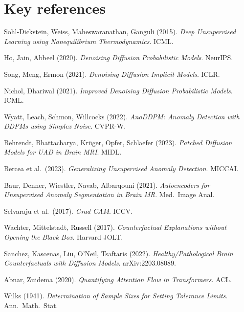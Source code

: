 \documentclass[12pt,a4paper]{article}
\begin{document}
\section*{Key references}
\begin{enumerate}[label={[\arabic*]},leftmargin=2.4em]
\item Sohl-Dickstein, Weiss, Maheswaranathan, Ganguli (2015). \textit{Deep Unsupervised Learning using Nonequilibrium Thermodynamics}. ICML.
\item Ho, Jain, Abbeel (2020). \textit{Denoising Diffusion Probabilistic Models}. NeurIPS.
\item Song, Meng, Ermon (2021). \textit{Denoising Diffusion Implicit Models}. ICLR.
\item Nichol, Dhariwal (2021). \textit{Improved Denoising Diffusion Probabilistic Models}. ICML.
\item Wyatt, Leach, Schmon, Willcocks (2022). \textit{AnoDDPM: Anomaly Detection with DDPMs using Simplex Noise}. CVPR-W.
\item Behrendt, Bhattacharya, Krüger, Opfer, Schlaefer (2023). \textit{Patched Diffusion Models for UAD in Brain MRI}. MIDL.
\item Bercea et al.\ (2023). \textit{Generalizing Unsupervised Anomaly Detection}. MICCAI.
\item Baur, Denner, Wiestler, Navab, Albarqouni (2021). \textit{Autoencoders for Unsupervised Anomaly Segmentation in Brain MR}. Med.\ Image Anal.
\item Selvaraju et al.\ (2017). \textit{Grad-CAM}. ICCV.
\item Wachter, Mittelstadt, Russell (2017). \textit{Counterfactual Explanations without Opening the Black Box}. Harvard JOLT.
\item Sanchez, Kascenas, Liu, O'Neil, Tsaftaris (2022). \textit{Healthy/Pathological Brain Counterfactuals with Diffusion Models}. arXiv:2203.08089.
\item Abnar, Zuidema (2020). \textit{Quantifying Attention Flow in Transformers}. ACL.
\item Wilks (1941). \textit{Determination of Sample Sizes for Setting Tolerance Limits}. Ann.\ Math.\ Stat.
\end{enumerate}
\end{document}
